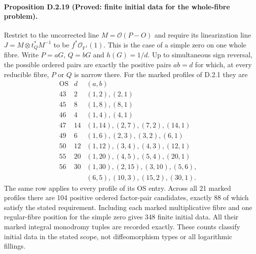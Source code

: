 \paragraph{Proposition D.2.19 (Proved: finite initial data for the whole-fibre problem).}
Restrict to the uncorrected line
$M=\mathcal O(P-O)$ and require its linearization line
$J=M\otimes t_Q^*M^{-1}$ to be $f^*\mathcal O_{\mathbb P^1}(1)$.
This is the case of a simple zero on one whole fibre.
Write $P=aG$, $Q=bG$ and $h(G)=1/d$.
Up to simultaneous sign reversal, the possible ordered
pairs are exactly the positive pairs $ab=d$ for which,
at every reducible fibre, $P$ or $Q$ is narrow there.
For the marked profiles of D.2.1 they are
\[
\begin{array}{c|r|l}
 \mathrm{OS}&d& (a,b)\\\hline
 43&2&(1,2),(2,1)\\
 45&8&(1,8),(8,1)\\
 46&4&(1,4),(4,1)\\
 47&14&(1,14),(2,7),(7,2),(14,1)\\
 49&6&(1,6),(2,3),(3,2),(6,1)\\
 50&12&(1,12),(3,4),(4,3),(12,1)\\
 55&20&(1,20),(4,5),(5,4),(20,1)\\
 56&30&(1,30),(2,15),(3,10),(5,6),\\
 &&(6,5),(10,3),(15,2),(30,1).
\end{array}
\tag{D.F1}
\]
The same row applies to every profile of its OS entry.
Across all 21 marked profiles there are 104 positive
ordered factor-pair candidates, exactly 88 of which
satisfy the stated requirement. Including each marked
multiplicative fibre and one regular-fibre position for
the simple zero gives 348 finite initial data. All their
marked integral monodromy tuples are recorded exactly.
These counts classify initial data in the stated scope,
not diffeomorphism types or all logarithmic fillings.
